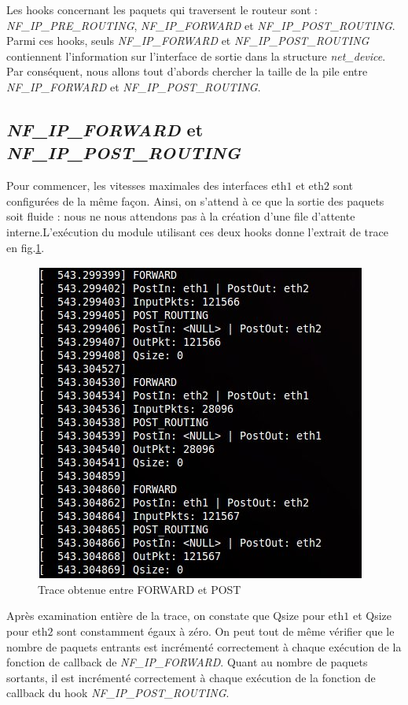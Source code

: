 \documentclass[a4paper]{article}
\begin{document}
Les hooks concernant les paquets qui traversent le routeur sont :
\textit{NF\_IP\_PRE\_ROUTING}, \textit{NF\_IP\_FORWARD} et
\textit{NF\_IP\_POST\_ROUTING}. Parmi ces hooks, seuls
\textit{NF\_IP\_FORWARD} et \textit{NF\_IP\_POST\_ROUTING}
contiennent l'information sur l'interface de sortie dans la
structure \textit{net\_device}. Par conséquent, nous allons
tout d'abords chercher la taille de la pile entre
\textit{NF\_IP\_FORWARD} et \textit{NF\_IP\_POST\_ROUTING}.

\subsection{\textit{NF\_IP\_FORWARD} et \textit{NF\_IP\_POST\_ROUTING}}
Pour commencer, les vitesses maximales des interfaces eth$1$ et
eth$2$ sont configurées de la même façon. Ainsi, on s'attend à
ce que la sortie des paquets soit fluide : nous ne nous attendons
pas à la création d'une file d'attente interne.L'exécution du module
utilisant ces deux hooks donne l'extrait de trace en
fig.\ref{forwardpost}.

\begin{figure}[!ht]
	\centering
	\includegraphics[scale=.5]{forward_post.jpg}
	\caption{\label{forwardpost} Trace obtenue entre FORWARD et POST}
\end{figure}

Après examination entière de la trace, on constate que Qsize
pour eth$1$ et Qsize pour eth$2$ sont constamment égaux à zéro.
On peut tout de même vérifier que le nombre de paquets entrants
est incrémenté correctement à chaque exécution de la fonction
de callback de \textit{NF\_IP\_FORWARD}. Quant au nombre de paquets
sortants, il est incrémenté correctement à chaque exécution de la
fonction de callback du hook \textit{NF\_IP\_POST\_ROUTING}.
\end{document}
